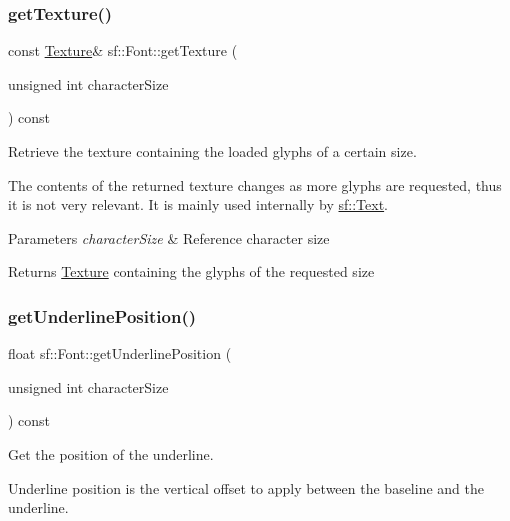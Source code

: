 \subsubsection{\texorpdfstring{getTexture()}{getTexture()}}
{\footnotesize\ttfamily const \mbox{\hyperlink{classsf_1_1_texture}{Texture}}\& sf\+::\+Font\+::get\+Texture (\begin{DoxyParamCaption}\item[{unsigned int}]{character\+Size }\end{DoxyParamCaption}) const}



Retrieve the texture containing the loaded glyphs of a certain size. 

The contents of the returned texture changes as more glyphs are requested, thus it is not very relevant. It is mainly used internally by \mbox{\hyperlink{classsf_1_1_text}{sf\+::\+Text}}.


\begin{DoxyParams}{Parameters}
{\em character\+Size} & Reference character size\\
\hline
\end{DoxyParams}
\begin{DoxyReturn}{Returns}
\mbox{\hyperlink{classsf_1_1_texture}{Texture}} containing the glyphs of the requested size \begin{DoxyVerb}\end{DoxyVerb}
 
\end{DoxyReturn}
\mbox{\label{classsf_1_1_font_a726a55f40c19ac108e348b103190caad}} 
\subsubsection{\texorpdfstring{getUnderlinePosition()}{getUnderlinePosition()}}
{\footnotesize\ttfamily float sf\+::\+Font\+::get\+Underline\+Position (\begin{DoxyParamCaption}\item[{unsigned int}]{character\+Size }\end{DoxyParamCaption}) const}



Get the position of the underline. 

Underline position is the vertical offset to apply between the baseline and the underline.


